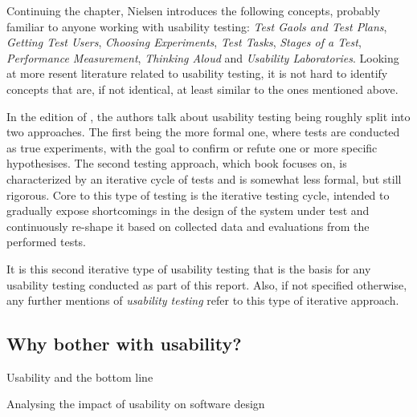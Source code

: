   Continuing the chapter, Nielsen introduces the following concepts, probably
  familiar to anyone working with usability testing:
  \textit{Test Gaols and Test Plans},
  \textit{Getting Test Users},
  \textit{Choosing Experiments},
  \textit{Test Tasks},
  \textit{Stages of a Test},
  \textit{Performance Measurement},
  \textit{Thinking Aloud} and
  \textit{Usability Laboratories}.
  Looking at more resent literature related to usability testing, it is not
  hard to identify concepts that are, if not identical, at least similar to the
  ones mentioned above.

  In the \citeyear{citeHandbookUsability} edition of
  \cite[p. 19]{citeHandbookUsability}, the
  authors talk about usability testing being roughly split into two approaches.
  The first being the more formal one, where tests are conducted as true
  experiments, with the goal to confirm or refute one or more specific
  hypothesises. The second testing approach, which book focuses on, is
  characterized by an iterative cycle of tests and is somewhat less formal, but
  still rigorous. Core to this type of testing is the iterative testing cycle,
  intended to gradually expose shortcomings in the design of the system under
  test and continuously re-shape it based on collected data and evaluations
  from the performed tests.

  It is this second iterative type of usability testing that is the basis for
  any usability testing conducted as part of this report. Also, if not
  specified otherwise, any further mentions of \textit{usability testing}
  refer to this type of iterative approach.






%
%

  \subsection{Why bother with usability?}

    Usability and the bottom line
    \cite{citeBottomLine}

    Analysing the impact of usability on software design
    \cite{citeImpactSoftwareDesign}


